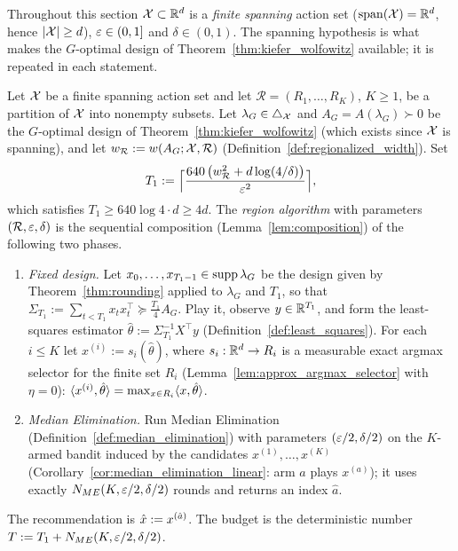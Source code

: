 Throughout this section $\mathcal{X} \subset \mathbb{R}^d$ is a \emph{finite spanning} action set
($\operatorname{span}(\mathcal{X}) = \mathbb{R}^d$, hence $\lvert \mathcal{X} \rvert \ge d$), $\varepsilon \in (0,1]$ and $\delta \in (0,1)$. The
spanning hypothesis is what makes the $G$-optimal design of
Theorem~\ref{thm:kiefer_wolfowitz} available; it is repeated in each statement.

\begin{definition}\label{def:region_algorithm}
\leanok
{}
Let $\mathcal{X}$ be a finite spanning action set and let $\mathcal R = (R_1,\dots,R_K)$, $K \ge 1$,
be a partition of $\mathcal{X}$ into nonempty subsets. Let $\lambda_G \in \triangle_{\mathcal{X}}$ and
$A_G = A(\lambda_G) \succ 0$ be the $G$-optimal design of Theorem~\ref{thm:kiefer_wolfowitz}
(which exists since $\mathcal{X}$ is spanning), and let
$w_{\mathcal R} := w(A_G;\mathcal{X},\mathcal R)$ (Definition~\ref{def:regionalized_width}). Set
\[
  T_1 := \Big\lceil \frac{640\,\big(w_{\mathcal R}^2 + d\log(4/\delta)\big)}{\varepsilon^2}\Big\rceil ,
\]
which satisfies $T_1 \ge 640\log 4\cdot d \ge 4d$. The \emph{region algorithm} with
parameters $(\mathcal R, \varepsilon, \delta)$ is the sequential composition
(Lemma~\ref{lem:composition}) of the following two phases.
\begin{enumerate}
  \item[(1)] \emph{Fixed design.} Let $x_0,\dots,x_{T_1-1} \in \operatorname{supp}\lambda_G$ be the design
        given by Theorem~\ref{thm:rounding} applied to $\lambda_G$ and $T_1$, so that
        $\Sigma_{T_1} := \sum_{t<T_1}x_tx_t^\top \succeq \frac{T_1}{4}A_G$. Play it, observe
        $y \in \mathbb{R}^{T_1}$, and form the least-squares estimator
        $\hat\theta := \Sigma_{T_1}^{-1}X^\top y$ (Definition~\ref{def:least_squares}). For each
        $i \le K$ let $x^{(i)} := s_i(\hat\theta)$, where $s_i : \mathbb{R}^d \to R_i$ is a measurable
        exact argmax selector for the finite set $R_i$ (Lemma~\ref{lem:approx_argmax_selector}
        with $\eta = 0$): $\langle x^{(i)}, \hat\theta \rangle = \max_{x\in R_i}\langle x, \hat\theta \rangle$.
  \item[(2)] \emph{Median Elimination.} Run Median Elimination
        (Definition~\ref{def:median_elimination}) with parameters $(\varepsilon/2, \delta/2)$ on the
        $K$-armed bandit induced by the candidates $x^{(1)},\dots,x^{(K)}$
        (Corollary~\ref{cor:median_elimination_linear}: arm $a$ plays $x^{(a)}$); it uses
        exactly $N_{ME}(K,\varepsilon/2,\delta/2)$ rounds and returns an index $\hat a$.
\end{enumerate}
The recommendation is $\hat{x} := x^{(\hat a)}$. The budget is the deterministic number
$T := T_1 + N_{ME}(K, \varepsilon/2, \delta/2)$.
\end{definition}

